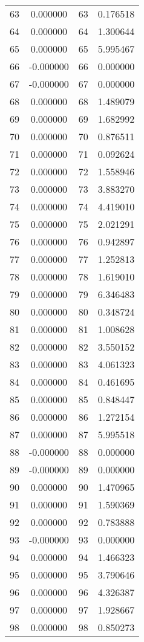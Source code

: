 \documentclass[12pt]{article}
\begin{document}
\begin{longtable}{@{}cccc@{}}
63 & 0.000000 & 63 & 0.176518 \\
64 & 0.000000 & 64 & 1.300644 \\
65 & 0.000000 & 65 & 5.995467 \\
66 & -0.000000 & 66 & 0.000000 \\
67 & -0.000000 & 67 & 0.000000 \\
68 & 0.000000 & 68 & 1.489079 \\
69 & 0.000000 & 69 & 1.682992 \\
70 & 0.000000 & 70 & 0.876511 \\
71 & 0.000000 & 71 & 0.092624 \\
72 & 0.000000 & 72 & 1.558946 \\
73 & 0.000000 & 73 & 3.883270 \\
74 & 0.000000 & 74 & 4.419010 \\
75 & 0.000000 & 75 & 2.021291 \\
76 & 0.000000 & 76 & 0.942897 \\
77 & 0.000000 & 77 & 1.252813 \\
78 & 0.000000 & 78 & 1.619010 \\
79 & 0.000000 & 79 & 6.346483 \\
80 & 0.000000 & 80 & 0.348724 \\
81 & 0.000000 & 81 & 1.008628 \\
82 & 0.000000 & 82 & 3.550152 \\
83 & 0.000000 & 83 & 4.061323 \\
84 & 0.000000 & 84 & 0.461695 \\
85 & 0.000000 & 85 & 0.848447 \\
86 & 0.000000 & 86 & 1.272154 \\
87 & 0.000000 & 87 & 5.995518 \\
88 & -0.000000 & 88 & 0.000000 \\
89 & -0.000000 & 89 & 0.000000 \\
90 & 0.000000 & 90 & 1.470965 \\
91 & 0.000000 & 91 & 1.590369 \\
92 & 0.000000 & 92 & 0.783888 \\
93 & -0.000000 & 93 & 0.000000 \\
94 & 0.000000 & 94 & 1.466323 \\
95 & 0.000000 & 95 & 3.790646 \\
96 & 0.000000 & 96 & 4.326387 \\
97 & 0.000000 & 97 & 1.928667 \\
98 & 0.000000 & 98 & 0.850273 \\

\end{longtable}
\end{document}
